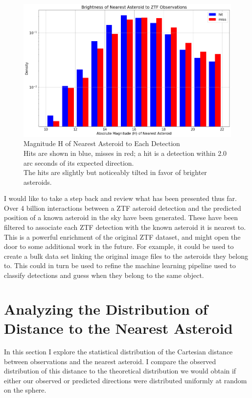\begin{figure}[hbt!]
\begin{center}
\includegraphics[width=1.0\textwidth]{../figs/ztf/nearest_ast_brightness.png}
\caption{Magnitude H of Nearest Asteroid to Each Detection\\
Hits are shown in blue, misses in red; a hit is a detection within 2.0 arc seconds of its expected direction.\\
The hits are slightly but noticeably tilted in favor of brighter asteroids.}
\end{center}
\end{figure}

I would like to take a step back and review what has been presented thus far.
Over 4 billion interactions between a ZTF asteroid detection and the predicted position of a known asteroid in the sky have been generated.
These have been filtered to associate each ZTF detection with the known asteroid it is nearest to.
This is a powerful enrichment of the original ZTF dataset, and might open the door to some additional work in the future.
For example, it could be used to create a bulk data set linking the original image files to the asteroids they belong to.
This could in turn be used to refine the machine learning pipeline used to classify detections and guess when they belong to the same object.

\section{Analyzing the Distribution of Distance to the Nearest Asteroid}
\label{section_nearest_ast_distribution}
In this section I explore the statistical distribution of the Cartesian distance between observations and the nearest asteroid.
I compare the observed distribution of this distance to the theoretical distribution we would obtain 
if either our observed or predicted directions were distributed uniformly at random on the sphere.

